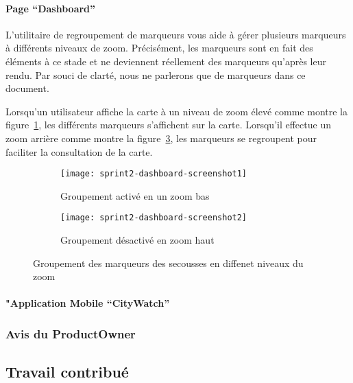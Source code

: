 \paragraph{Page ``Dashboard''}
L'utilitaire de regroupement de marqueurs vous aide à gérer plusieurs marqueurs à différents niveaux de zoom.
Précisément, les  marqueurs  sont en fait des éléments à ce stade et ne deviennent réellement des
marqueurs qu'après leur rendu. Par souci de clarté, nous ne parlerons que de marqueurs 
dans ce document.

Lorsqu'un utilisateur affiche la carte à un niveau de zoom élevé comme montre la
figure~\ref{fig:sprint2-dashboard-screenshot1}, les différents marqueurs
s'affichent sur la carte. Lorsqu'il effectue un zoom arrière comme montre la
figure~\ref{fig:sprint2-dashboard-screenshot2}, les marqueurs se regroupent pour faciliter la consultation de la carte.

\begin{figure}[htbp]
    \begin{subfigure}{.5\textwidth}
    \centering
  \centering
  \texttt{[image: sprint2-dashboard-screenshot1]}
  \caption{Groupement activé en un zoom bas}
  \label{fig:sprint2-dashboard-screenshot1}
\end{subfigure}
\begin{subfigure}{.5\textwidth}
    \centering
  \centering
  \texttt{[image: sprint2-dashboard-screenshot2]}
  \caption{Groupement désactivé en zoom haut}
  \label{fig:sprint2-dashboard-screenshot2}
\end{subfigure}
\caption{Groupement des marqueurs des secousses en diffenet niveaux du zoom}
\end{figure}


\paragraph{"Application Mobile ``CityWatch''}
\subsubsection{Avis du ProductOwner}
\subsection{Travail contribué}
